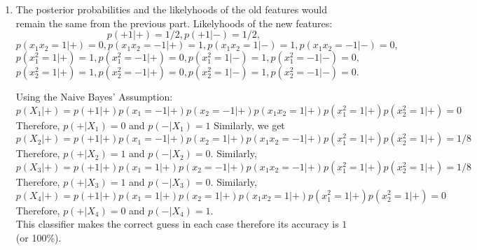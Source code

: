 \documentclass[twoside]{article}
\begin{document}
\begin{enumerate}
    \item
    The posterior probabilities and the likelyhoods of the old features would remain the same from the previous part. Likelyhoods of the new features:
    \begin{equation*}
        p(+1|+) = 1/2, p(+1|-) = 1/2,
    \end{equation*}
    \begin{equation*}
        p(x_1x_2 = 1|+) = 0, p(x_1x_2 = -1|+) = 1, p(x_1x_2 = 1|-) = 1, p(x_1x_2 = -1|-) = 0,
    \end{equation*}
    \begin{equation*}
        p(x_1^2 = 1|+) = 1, p(x_1^2 = -1|+) = 0, p(x_1^2 = 1|-) = 1, p(x_1^2 = -1|-) = 0,
    \end{equation*}
        \begin{equation*}
        p(x_2^2 = 1|+) = 1, p(x_2^2 = -1|+) = 0, p(x_2^2 = 1|-) = 1, p(x_2^2 = -1|-) = 0.
    \end{equation*}
    
    Using the Naive Bayes' Assumption:
    \begin{equation*}
        p(X_1|+) = p(+1|+)p(x_1=-1|+)p(x_2=-1|+)p(x_1x_2=1|+)p(x_1^2=1|+)p(x_2^2=1|+) = 0
    \end{equation*}
    Therefore, $p(+|X_1) = 0$ and $p(-|X_1) = 1$
    Similarly, we get
    \begin{equation*}
         p(X_2|+) = p(+1|+)p(x_1=-1|+)p(x_2=1|+)p(x_1x_2=-1|+)p(x_1^2=1|+)p(x_2^2=1|+) = 1/8
    \end{equation*}
    Therefore, $p(+|X_2) = 1$ and $p(-|X_2) = 0$.
    Similarly,
    \begin{equation*}
        p(X_3|+) = p(+1|+)p(x_1=1|+)p(x_2=-1|+)p(x_1x_2=-1|+)p(x_1^2=1|+)p(x_2^2=1|+) = 1/8
    \end{equation*}
    Therefore, $p(+|X_3) = 1$ and $p(-|X_3) = 0$.
    Similarly,
    \begin{equation*}
        p(X_4|+) = p(+1|+)p(x_1=1|+)p(x_2=1|+)p(x_1x_2=1|+)p(x_1^2=1|+)p(x_2^2=1|+) = 0
    \end{equation*}
    Therefore, $p(+|X_4) = 0$ and $p(-|X_4) = 1$.\\
    This classifier makes the correct guess in each case therefore its accuracy is $1$ (or 100\%).
    

\end{enumerate}
\end{document}
